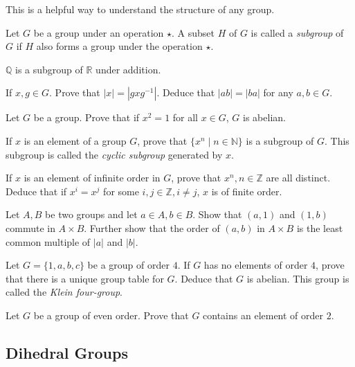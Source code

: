 This is a helpful way to understand the structure of any group.

\begin{definition}
Let $G$ be a group under an operation $\star$. A subset $H$ of $G$ is called a \textit{subgroup} of $G$ if $H$ also forms a group under the operation $\star$.
\end{definition}

\begin{example}
$\mathbb{Q}$ is a subgroup of $\mathbb{R}$ under addition.
\end{example}

\begin{exercise}
    If $x,g\in G$. Prove that $|x|=|gxg^{-1}|$. Deduce that $|ab|=|ba|$ for any $a,b\in G$.
\end{exercise}
\begin{exercise}
    Let $G$ be a group. Prove that if $x^2=1$ for all $x\in G$, $G$ is abelian.
\end{exercise}
\begin{exercise}
    If $x$ is an element of a group $G$, prove that $\{x^n\mid n\in\mathbb{N}\}$ is a subgroup of $G$. This subgroup is called the \textit{cyclic subgroup} generated by $x$.
\end{exercise}
\begin{exercise}
    If $x$ is an element of infinite order in $G$, prove that $x^n, n\in\mathbb{Z}$ are all distinct. Deduce that if $x^i=x^j$ for some $i,j\in\mathbb{Z}, i\neq j$, $x$ is of finite order.
\end{exercise}
\begin{exercise}
    Let $A,B$ be two groups and let $a\in A, b\in B$. Show that $(a,1)$ and $(1,b)$ commute in $A\times B$. Further show that the order of $(a,b)$ in $A\times B$ is the least common multiple of $|a|$ and $|b|$.
\end{exercise}
\begin{exercise}
\label{k4q1}
    Let $G=\{1,a,b,c\}$ be a group of order $4$. If $G$ has no elements of order $4$, prove that there is a unique group table for $G$. Deduce that $G$ is abelian. This group is called the \textit{Klein four-group}.
\end{exercise}

\begin{exercise}
    Let $G$ be a group of even order. Prove that $G$ contains an element of order $2$.
\end{exercise}

\subsection{Dihedral Groups}

